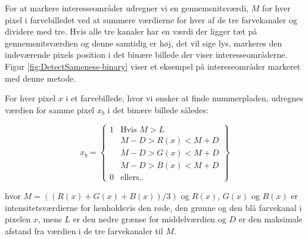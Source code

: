 For at markere interesseområder udregner vi en gennemsnitsværdi, $M$ for hver pixel i farvebilledet ved at summere værdierne for hver af de tre farvekanaler og dividere med tre. Hvis alle tre kanaler har en værdi der ligger tæt på gennemsnitsværdien og denne samtidig er høj, det vil sige lys, markeres den indeværende pixels position i det binære billede der viser interesseområderne. Figur \ref{fig:DetectSameness-binary} viser et eksempel på intereseområder markeret med denne metode. 

For hver pixel $x$ i et farvebillede, hvor vi ønsker at finde nummerpladen, udregnes værdien for samme pixel $x_{b}$ i det binære billede således:

\begin{equation}
x_{b} = 
\begin{Bmatrix}
1 & \text{Hvis } M > L\\
 & M-D > R(x) < M+D\\
  & M-D > G(x) < M+D\\
   & M-D > B(x) < M+D\\
0 & \text{ellers..}
\end{Bmatrix}
\end{equation}


hvor $M = ((R(x)+G(x)+B(x))/3)$ og $R(x)$, $G(x)$ og $B(x)$ er intensitetsværdierne for henholdsvis den røde, den grønne og den blå farvekanal i pixelen $x$, mens $L$ er den nedre grænse for middelværdien og $D$ er den maksimale afstand fra værdien i de tre farvekanaler til $M$.




